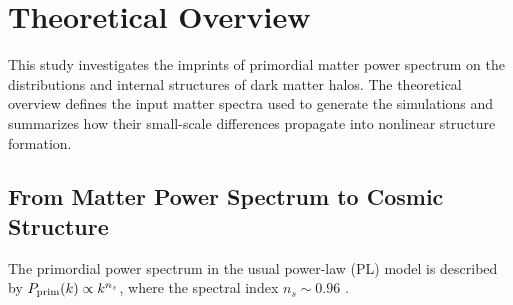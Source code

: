 \documentclass[
 reprint,
 superscriptaddress,
 nofootinbib,
 nobibnotes,
 amsmath,
 amssymb,
 aps,
 prd,
 floatfix,
 longbibliography
]{revtex4-2}
\begin{document}
\section{Theoretical Overview}
\label{sec:theory}

This study investigates the imprints of primordial matter power spectrum on the distributions and internal structures of dark matter halos. The theoretical overview defines the input matter spectra used to generate the simulations and summarizes how their small-scale differences propagate into nonlinear structure formation.

\subsection{From Matter Power Spectrum to Cosmic Structure}






The primordial power spectrum in the usual power-law (PL) model is described by $P_{\rm prim}(k)\propto k^{n_s}$, where the spectral index $n_s\sim 0.96$ \citep{Planck20CMB}.
\end{document}
